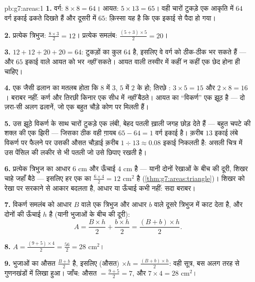 \begin{solution}{pb:g7:areas:1}
\textbf{1.} वर्ग: $8 \times 8 = 64$। आयत: $5 \times 13 = 65$।
वही चारों टुकड़े एक आकृति में $64$ वर्ग इकाई ढकते दिखते हैं और
दूसरी में $65$: क़िस्सा यह है कि एक इकाई   से पैदा हो
गया।

\textbf{2.} प्रत्येक त्रिभुज: $\frac{8 \times 3}{2} = 12$।
प्रत्येक समलंब: $\frac{(5 + 3) \times 5}{2} = 20$।

\textbf{3.} $12 + 12 + 20 + 20 = 64$: टुकड़ों का कुल $64$ है,
इसलिए वे वर्ग को ठीक-ठीक भर सकते हैं --- और $65$ इकाई वाले आयत को
भर \emph{नहीं} सकते। आयत वाली तस्वीर में कहीं न कहीं एक छेद होना ही
चाहिए।

\textbf{4.} एक जैसी ढलान का मतलब होता कि $8$ में $3$, $5$ में $2$
के  हो; तिरछे : $3 \times 5 = 15$ और
$2 \times 8 = 16$। बराबर नहीं: कर्ण और तिरछी किनार एक सीध में
\emph{नहीं} बैठते। आयत का ``विकर्ण'' एक झूठ है --- दो ज़रा-सी
अलग ढलानें, जो एक बहुत चौड़े कोण पर मिलती हैं।

\textbf{5.} उस झूठे विकर्ण के साथ चारों टुकड़े एक लंबी, बेहद पतली
ख़ाली जगह छोड़ देते हैं --- बहुत चपटे  की शक्ल की एक
झिरी --- जिसका  ठीक वही ग़ायब $65 - 64 = 1$ वर्ग इकाई है।
क़रीब $13$ इकाई लंबे विकर्ण पर फैलने पर उसकी औसत चौड़ाई क़रीब
$1 \div 13 \approx 0.08$ इकाई निकलती है: असली चित्र में उस पेंसिल की
लकीर से भी पतली जो उसे छिपाए रखती है।

\textbf{6.} प्रत्येक त्रिभुज का आधार $6$ cm और ऊँचाई $4$ cm है ---
यानी दोनों  रेखाओं के बीच की दूरी, शिखर चाहे जहाँ बैठे ---
इसलिए हर एक का  $\frac{6 \times 4}{2} = 12$ cm$^2$ है
(\cref{thm:g7:areas:triangle})। शिखर को  रेखा पर सरकाने से
आकार बदलता है, आधार या ऊँचाई कभी नहीं:  सदा बराबर।

\textbf{7.} विकर्ण समलंब को आधार $B$ वाले एक त्रिभुज और आधार $b$
वाले दूसरे त्रिभुज में काट देता है, और दोनों की ऊँचाई $h$ है (यानी
 भुजाओं के बीच की दूरी):
\[
A = \frac{B \times h}{2} + \frac{b \times h}{2}
= \frac{(B + b) \times h}{2} .
\]

\textbf{8.} $A = \frac{(9 + 5) \times 4}{2} = \frac{56}{2} =
28$ cm$^2$।

\textbf{9.}  भुजाओं का औसत $\frac{B + b}{2}$ है, इसलिए
(औसत) $\times h = \frac{(B+b) \times h}{2}$: वही सूत्र, बस अलग
तरह से गुणनखंडों में लिखा हुआ। जाँच: औसत $= \frac{9+5}{2} = 7$, और
$7 \times 4 = 28$ cm$^2$।


\end{solution}
